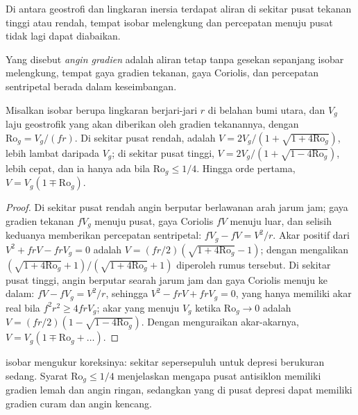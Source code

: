 Di antara geostrofi dan lingkaran inersia terdapat aliran di sekitar pusat
tekanan tinggi atau rendah, tempat isobar melengkung dan percepatan
menuju pusat tidak lagi dapat diabaikan.

\begin{definition}\label{def:b3:gfd-foundations:gradient}
Yang disebut \emph{angin gradien} adalah aliran tetap tanpa gesekan
sepanjang isobar melengkung, tempat gaya gradien tekanan, gaya
Coriolis, dan percepatan sentripetal berada dalam keseimbangan.
\end{definition}

\begin{proposition}\label{prop:b3:gfd-foundations:gradient}
Misalkan isobar berupa lingkaran berjari-jari $r$ di belahan bumi utara, dan
$V_g$ laju geostrofik yang akan diberikan oleh gradien tekanannya, dengan
$\mathrm{Ro}_g = V_g/(fr)$. Di sekitar pusat rendah,  adalah
$V = 2V_g/(1 + \sqrt{1 + 4\mathrm{Ro}_g})$, lebih lambat daripada $V_g$; di sekitar
pusat tinggi, $V = 2V_g/(1 + \sqrt{1 - 4\mathrm{Ro}_g})$, lebih cepat, dan ia hanya ada
bila $\mathrm{Ro}_g \le 1/4$. Hingga orde pertama, $V = V_g(1 \mp \mathrm{Ro}_g)$.
\end{proposition}

\begin{proof}
Di sekitar pusat rendah angin berputar berlawanan arah jarum jam; gaya gradien tekanan
$fV_g$ menuju pusat, gaya Coriolis $fV$ menuju luar, dan selisih keduanya
memberikan percepatan sentripetal: $fV_g - fV = V^2/r$. Akar
positif dari $V^2 + frV - frV_g = 0$ adalah $V = (fr/2)(\sqrt{1 +
4\mathrm{Ro}_g} - 1)$; dengan mengalikan $(\sqrt{1 + 4\mathrm{Ro}_g} +
1)/(\sqrt{1 + 4\mathrm{Ro}_g} + 1)$ diperoleh rumus tersebut. Di sekitar pusat tinggi, angin
berputar searah jarum jam dan gaya Coriolis menuju ke dalam: $fV - fV_g =
V^2/r$, sehingga $V^2 - frV + frV_g = 0$, yang hanya memiliki akar real bila $f^2r^2
\ge 4frV_g$; akar yang menuju $V_g$ ketika $\mathrm{Ro}_g \to 0$ adalah
$V = (fr/2)(1 - \sqrt{1 - 4\mathrm{Ro}_g})$. Dengan menguraikan akar-akarnya,
$V = V_g(1 \mp \mathrm{Ro}_g + \dots)$.
\end{proof}

 isobar mengukur koreksinya: sekitar sepersepuluh untuk
depresi berukuran sedang. Syarat $\mathrm{Ro}_g \le 1/4$ menjelaskan mengapa
pusat antisiklon memiliki gradien lemah dan angin ringan, sedangkan
yang di pusat depresi dapat memiliki gradien curam dan angin kencang.

